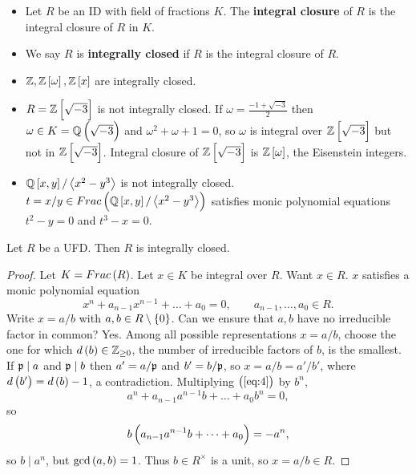 \begin{definition}
\hfill
\begin{itemize}
\item Let $ R $ be an ID with field of fractions $ K $. The \textbf{integral closure} of $ R $ is the integral closure of $ R $ in $ K $.
\item We say $ R $ is \textbf{integrally closed} if $ R $ is the integral closure of $ R $.
\end{itemize}
\end{definition}

\begin{example*}
\hfill
\begin{itemize}
\item $ \Z, \Z\sbr{\omega}, \Z\sbr{x} $ are integrally closed.
\item $ R = \Z\sbr{\sqrt{-3}} $ is not integrally closed. If $ \omega = \tfrac{-1 + \sqrt{-3}}{2} $ then $ \omega \in K = \Q\br{\sqrt{-3}} $ and $ \omega^2 + \omega + 1 = 0 $, so $ \omega $ is integral over $ \Z\sbr{\sqrt{-3}} $ but not in $ \Z\sbr{\sqrt{-3}} $. Integral closure of $ \Z\sbr{\sqrt{-3}} $ is $ \Z\sbr{\omega} $, the Eisenstein integers.
\item $ \Q\sbr{x, y} / \abr{x^2 - y^3} $ is not integrally closed. $ t = x / y \in Frac\br{\Q\sbr{x, y} / \abr{x^2 - y^3}} $ satisfies monic polynomial equations $ t^2 - y = 0 $ and $ t^3 - x = 0 $.
\end{itemize}
\end{example*}


\begin{proposition}
Let $ R $ be a UFD. Then $ R $ is integrally closed.
\end{proposition}

\begin{proof}
Let $ K = Frac\br{R} $. Let $ x \in K $ be integral over $ R $. Want $ x \in R $. $ x $ satisfies a monic polynomial equation
\begin{equation}
\label{eq:4}
x^n + a_{n - 1}x^{n - 1} + \dots + a_0 = 0, \qquad a_{n - 1}, \dots, a_0 \in R.
\end{equation}
Write $ x = a / b $ with $ a, b \in R \setminus \cbr{0} $. Can we ensure that $ a, b $ have no irreducible factor in common? Yes. Among all possible representations $ x = a / b $, choose the one for which $ d\br{b} \in \Z_{\ge 0} $, the number of irreducible factors of $ b $, is the smallest. If $ \mathfrak{p} \mid a $ and $ \mathfrak{p} \mid b $ then $ a' = a / \mathfrak{p} $ and $ b' = b / \mathfrak{p} $, so $ x = a / b = a' / b' $, where $ d\br{b'} = d\br{b} - 1 $, a contradiction. Multiplying $ \br{\ref{eq:4}} $ by $ b^n $,
$$ a^n + a_{n - 1}a^{n - 1}b + \dots + a_0b^n = 0, $$
so
$$ b\br{a_{n - 1}a^{n - 1}b + \dots + a_0} = -a^n, $$
so $ b \mid a^n $, but $ \gcd\br{a, b} = 1 $. Thus $ b \in R^\times $ is a unit, so $ x = a / b \in R $.
\end{proof}

